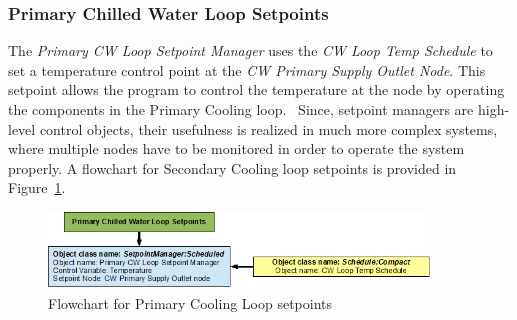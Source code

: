 \subsubsection{Primary Chilled Water Loop Setpoints}\label{primary-chilled-water-loop-setpoints}

The \emph{Primary CW Loop Setpoint Manager} uses the \emph{CW Loop Temp Schedule} to set a temperature control point at the \emph{CW Primary Supply Outlet Node}. This setpoint allows the program to control the temperature at the node by operating the components in the Primary Cooling loop. ~Since, setpoint managers are high-level control objects, their usefulness is realized in much more complex systems, where multiple nodes have to be monitored in order to operate the system properly. A flowchart for Secondary Cooling loop setpoints is provided in Figure~\ref{fig:flowchart-for-primary-cooling-loop-setpoints}.

\begin{figure}[hbtp] %
\centering
\includegraphics[width=0.9\textwidth, height=0.9\textheight, keepaspectratio=true]{media/image102.png}
\caption{Flowchart for Primary Cooling Loop setpoints \protect \label{fig:flowchart-for-primary-cooling-loop-setpoints}}
\end{figure}
